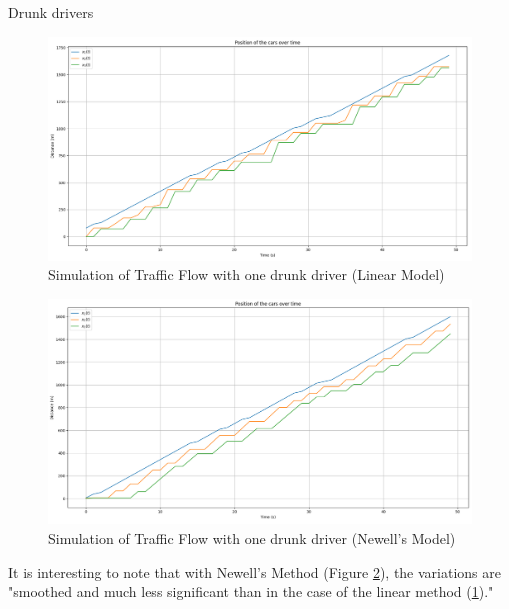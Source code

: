 \documentclass{beamer}
\begin{document}
\begin{frame}{Drunk drivers }
	\begin{minipage}{0.49\textwidth}
		\centering
		\begin{figure}
			\includegraphics[width=1.0\textwidth]{Model1W3C_O_Aco_D2_Linear.png}
			\caption{Simulation of Traffic Flow with one drunk driver (Linear Model)}
			\label{fig:DL}
		\end{figure}
	\end{minipage}\hfill
	\begin{minipage}{0.49\textwidth}
		\centering
		\begin{figure}
			\includegraphics[width=1.1\textwidth]{Model1W3C_O_Aco_D2_Newell.png}
			\caption{Simulation of Traffic Flow with one drunk driver (Newell's Model)}
			\label{fig:DN}
		\end{figure}
	\end{minipage}
	\begin{block}{}
		It is interesting to note that with Newell's Method (Figure \ref{fig:DN}), the variations are "smoothed and much less significant than in the case of the linear method (\ref{fig:DL})."
	\end{block}
\end{frame}
\end{document}
